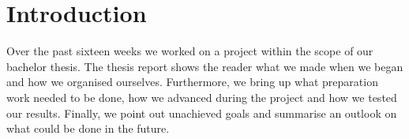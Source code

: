 
\chapter{Introduction}
Over the past sixteen weeks we worked on a project within the scope of our bachelor thesis. The thesis report shows the reader what we made when we began and how we organised ourselves. Furthermore, we bring up what preparation work needed to be done, how we advanced during the project and how we tested our results. Finally, we point out unachieved goals and summarise an outlook on what could be done in the future.

